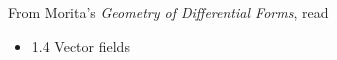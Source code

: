 \documentclass{homework}
\author{Jim Fowler}
\date{Week 3: Vector fields}
\begin{document}
\maketitle

From Morita's \textit{Geometry of Differential Forms}, read
\begin{itemize}
\item 1.4 Vector fields
\end{itemize}
\end{document}
